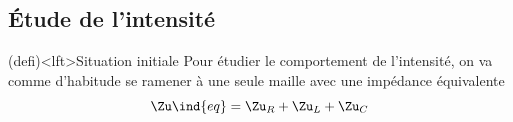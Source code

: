 \documentclass[../../main/main.tex]{subfiles}
\begin{document}
\subsection{Étude de l'intensité}
\begin{tcb}[sidebyside, righthand ratio=.3](defi)<lft>{Situation initiale}
	Pour étudier le comportement de l'intensité, on va comme d'habitude se
	ramener à une seule maille avec une impédance équivalente
	\[\Zu\ind{eq} = \Zu_R + \Zu_L + \Zu_C\]
	\tcblower
	\begin{center}
		\vspace{-15pt}
	\end{center}
\end{tcb}
\end{document}
